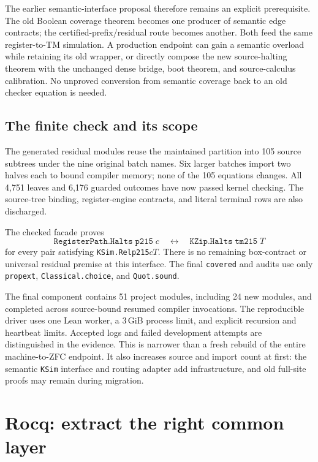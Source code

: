 \documentclass[11pt,letterpaper]{article}
\newcommand{\code}[1]{\texttt{#1}}
\begin{document}
The earlier semantic-interface proposal therefore remains an explicit prerequisite.
The old Boolean coverage theorem becomes one producer of semantic edge contracts;
the certified-prefix/residual route becomes another. Both feed the same register-to-TM
simulation. A production endpoint can gain a semantic overload while retaining its
old wrapper, or directly compose the new source-halting theorem with the unchanged
dense bridge, boot theorem, and source-calculus calibration. No unproved conversion
from semantic coverage back to an old checker equation is needed.

\subsection{The finite check and its scope}

The generated residual modules reuse the maintained partition into 105 source
subtrees under the nine original batch names. Six larger batches import two halves
each to bound compiler memory; none of the 105 equations changes. All 4,751 leaves
and 6,176 guarded outcomes have now passed kernel checking. The source-tree binding,
register-engine contracts, and literal terminal rows are also discharged.

The checked facade  proves
\[
 \code{RegisterPath.Halts}\;\code{p215}\;c
 \quad\longleftrightarrow\quad
 \code{KZip.Halts}\;\code{tm215}\;T
\]
for every pair satisfying \code{KSim.Rel}\;\code{p215}\;$c$\;$T$.
There is no remaining box-contract or universal residual premise at this interface.
The final \code{covered} and  audits use only
\code{propext}, \code{Classical.choice}, and \code{Quot.sound}.

The final component contains 51 project modules, including 24 new modules, and
completed across source-bound resumed compiler invocations. The reproducible driver
uses one Lean worker, a 3\,GiB process limit, and explicit recursion and heartbeat
limits. Accepted logs and failed development attempts are distinguished in the evidence.
This is narrower than a fresh rebuild of the entire machine-to-ZFC endpoint. It also
increases source and import count at first: the semantic \code{KSim} interface and
routing adapter add infrastructure, and old full-site proofs may remain during migration.

\section{Rocq: extract the right common layer}
\end{document}

